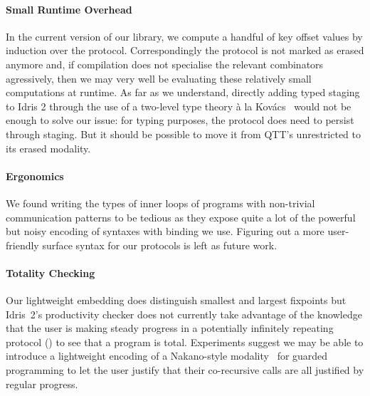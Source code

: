 \documentclass{easychair}
\begin{document}
\paragraph{Small Runtime Overhead}
In the current version of our library, we compute a handful
of key offset values by induction over the protocol. Correspondingly
the protocol is not marked as erased anymore and, if compilation does
not specialise the relevant combinators agressively, then we may very
well be evaluating these relatively small computations at runtime.
%
As far as we understand, directly adding typed staging to Idris 2
through the use of a two-level type theory à la
Kov{\'{a}}cs~\cite{DBLP:journals/pacmpl/Kovacs22} would not be
enough to solve our issue: for typing purposes, the protocol does need
to persist through staging. But it should be possible to move it
from QTT's unrestricted to its erased modality.

\paragraph{Ergonomics}
We found writing the types of inner loops of programs with non-trivial
communication patterns to be tedious as they expose quite a lot of the
powerful but noisy encoding of syntaxes with binding we use.
%
Figuring out a more user-friendly surface syntax for our protocols is
left as future work.

\paragraph{Totality Checking}
Our lightweight embedding does distinguish smallest and largest fixpoints
but Idris~2's productivity checker does not currently take advantage of the
knowledge that the user is making steady progress in a potentially infinitely
repeating protocol () to see that a program is total.
Experiments suggest we may be able to introduce a lightweight encoding of
a Nakano-style modality~\cite{DBLP:conf/lics/Nakano00} for guarded programming
to let the user justify that their co-recursive calls are all justified by
regular progress.






%
%
%

\end{document}
